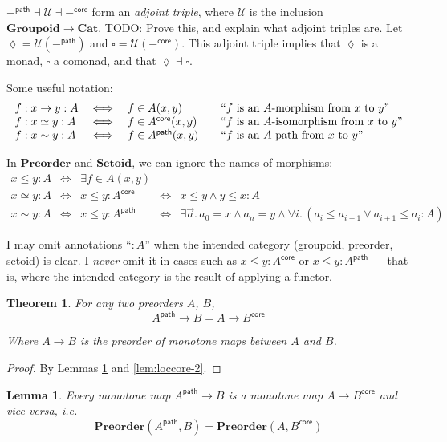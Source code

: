 \documentclass{article}
\newtheorem{theorem}{Theorem}
\newtheorem{lemma}{Lemma}
\newcommand{\todo}[1]{{\color{red}#1}}
\newcommand{\ms}[1]{\ensuremath{\mathsf{#1}}}
\newcommand{\mb}[1]{\ensuremath{\mathbf{#1}}}
\newcommand{\mc}[1]{\ensuremath{\mathcal{#1}}}
\newcommand{\binder}{.\,}
\newcommand{\bind}[1]{{#1}\binder}
\newcommand{\iso}{\ms{core}}
\renewcommand{\path}{\ms{path}}
\newcommand{\isoto}{\simeq}
\newcommand{\pathto}{\sim}
\begin{document}
$-^\path \dashv \mc{U} \dashv -^\iso$ form an \emph{adjoint triple}, where
$\mc{U}$ is the inclusion $\mb{Groupoid} \to \mb{Cat}$. \todo{TODO:
  Prove this, and explain what adjoint triples are.}
%
Let $\lozenge = \mc{U}(-^\path)$ and $\square = \mc{U}(-^\iso)$. This adjoint
triple implies that $\lozenge$ is a monad, $\square$ a comonad, and that
$\lozenge \dashv \square$.

Some useful notation:
\[\begin{array}{lcl@{\hskip 2em}l}
  f : x \to y : A &\iff& f \in A(x,y)
  & \text{``$f$ is an $A$-morphism from $x$ to $y$''}\\
  f : x \simeq y : A &\iff& f \in A^\iso(x,y)
  & \text{``$f$ is an $A$-isomorphism from $x$ to $y$''}\\
  f : x \pathto y : A &\iff& f \in A^\path(x,y)
  & \text{``$f$ is an $A$-path from $x$ to $y$''}
\end{array}\]

In $\mb{Preorder}$ and $\mb{Setoid}$, we can ignore the names of morphisms:
\[\begin{array}{lclcl}
  x \le y : A &\iff& \exists f \in A(x,y)\\
  x \isoto y : A &\iff& x \le y : A^\iso &\iff& x \le y \wedge y \le x : A\\
  x \pathto y : A &\iff& x \le y : A^\path
  &\iff& \exists\bind{\vec{a}} a_0 = x \wedge a_n = y
  \wedge \forall\bind{i} (a_i \le a_{i+1} \vee a_{i+1} \le a_i : A)
\end{array}\]

I may omit annotations ``$: A$'' when the intended category (groupoid, preorder,
setoid) is clear. I \emph{never} omit it in cases such as $x \le y : A^\iso$ or
$x \le y : A^\path$ --- that is, where the intended category is the result of
applying a functor.

\begin{theorem}\label{thm:loccore} For any two preorders $A$, $B$,
  \begin{equation}
    A^\path \to B = A \to B^\iso
  \end{equation}

  Where $A \to B$ is the preorder of monotone maps between $A$ and $B$.
\end{theorem}

\begin{proof} By Lemmas \ref{lem:loccore-1} and \ref{lem:loccore-2}.
\end{proof}

\begin{lemma}\label{lem:loccore-1}
  Every monotone map $A^\path \to B$ is a monotone map $A \to B^\iso$ and
  vice-versa, i.e.
  \[ \mb{Preorder}(A^\path, B) = \mb{Preorder}(A, B^\iso) \]
\end{lemma}
\end{document}
